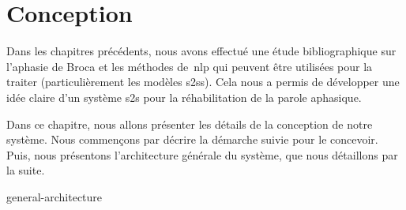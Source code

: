 \chapter{Conception}
\label{chap.conception}

Dans les chapitres précédents, nous avons effectué une étude bibliographique sur l'aphasie de Broca 
et les méthodes de~\gls{nlp} qui peuvent être utilisées pour la traiter 
(particulièrement les modèles \glspl{s2s}).
Cela nous a permis de développer une idée claire d'un système \gls{s2s} pour la réhabilitation de la parole aphasique.

Dans ce chapitre, nous allons présenter les détails de la conception de notre système.
Nous commençons par décrire la démarche suivie pour le concevoir.
Puis, nous présentons l'architecture générale du système, 
que nous détaillons par la suite.

{general-architecture}